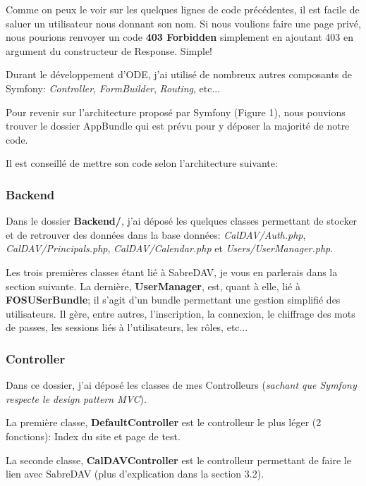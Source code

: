 Comme on peux le voir sur les quelques lignes de code précédentes, il est facile de saluer un utilisateur nous donnant son nom. Si nous voulions faire une page privé, nous pourions renvoyer un code \textbf{403 Forbidden} simplement en ajoutant 403 en argument du constructeur de Response. Simple!

Durant le développement d'ODE, j'ai utilisé de nombreux autres composants de Symfony: \textit{Controller}, \textit{FormBuilder}, \textit{Routing}, etc...

\vspace{1cm}

Pour revenir sur l'architecture proposé par Symfony (Figure 1), nous pouvions trouver le dossier AppBundle qui est prévu pour y déposer la majorité de notre code.


Il est conseillé de mettre son code selon l'architecture suivante:

\subsubsection*{Backend}

Dans le dossier \textbf{Backend/}, j'ai déposé les quelques classes permettant de stocker et de retrouver des données dans la base données: \textit{CalDAV/Auth.php}, \textit{CalDAV/Principals.php}, \textit{CalDAV/Calendar.php} et \textit{Users/UserManager.php}.

Les trois premières classes étant lié à SabreDAV, je vous en parlerais dans la section suivante. La dernière, \textbf{UserManager}, est, quant à elle, lié à \textbf{FOSUSerBundle}; il s'agit d'un bundle permettant une gestion simplifié des utilisateurs. Il gère, entre autres, l'inscription, la connexion, le chiffrage des mots de passes, les sessions liés à l'utilisateurs, les rôles, etc...

\subsubsection*{Controller}

Dans ce dossier, j'ai déposé les classes de mes Controlleurs (\textit{sachant que Symfony respecte le design pattern MVC}).

La première classe, \textbf{DefaultController} est le controlleur le plus léger (2 fonctions): Index du site et page de test.

La seconde classe, \textbf{CalDAVController} est le controlleur permettant de faire le lien avec SabreDAV (plus d'explication dans la section 3.2).

